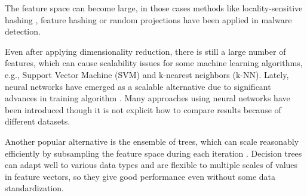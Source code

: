 The feature space can become large, in those cases methods like locality-sensitive hashing \cite{bayer2009scalable}, feature hashing \cite{jang2011bitshred} or random projections \cite{fradkin2003experiments} have been applied in malware detection.

Even after applying dimensionality reduction, there is still a large number of features, which can cause scalability issues for some machine learning algorithms, e.g., Support Vector Machine (SVM) and k-nearest neighbors (k-NN). Lately, neural networks have emerged as a scalable alternative due to significant advances in training algorithm \cite{almasi2016review}. Many approaches using neural networks have been introduced \cite{saxe2015deep, dahl2013large, kephart1995biologically, benchea2014combining} though it is not explicit how to compare results because of different datasets.

Another popular alternative is the ensemble of trees, which can scale reasonably efficiently by subsampling the feature space during each iteration \cite{breiman2001random}. Decision trees can adapt well to various data types and are flexible to multiple scales of values in feature vectors, so they give good performance even without some data standardization.

